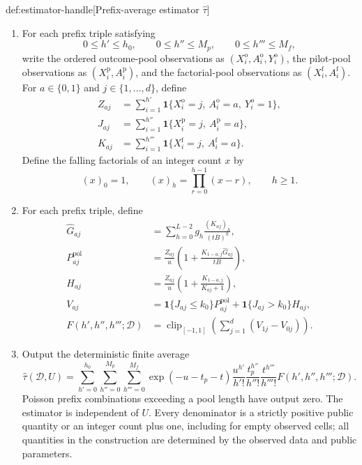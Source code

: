 \documentclass[11pt]{article}
\begin{document}
\begin{algorithmv}{def:estimator-handle}[Prefix-average estimator $\widehat\tau$]
\begin{enumerate}
\item For each prefix triple satisfying
\[
0\le h'\le h_0,\qquad
0\le h''\le M_p,\qquad
0\le h'''\le M_f,
\]
write the ordered outcome-pool observations as
\((X_i^{\mathrm o},A_i^{\mathrm o},Y_i^{\mathrm o})\), the pilot-pool observations as
\((X_i^{\mathrm p},A_i^{\mathrm p})\), and the factorial-pool observations as
\((X_i^{\mathrm f},A_i^{\mathrm f})\). For \(a\in\{0,1\}\) and \(j\in\{1,\ldots,d\}\), define
\[
\begin{aligned}
Z_{aj}
&=\sum_{i=1}^{h'}
\mathbf1\{X_i^{\mathrm o}=j,\ A_i^{\mathrm o}=a,\ Y_i^{\mathrm o}=1\},\\
J_{aj}
&=\sum_{i=1}^{h''}
\mathbf1\{X_i^{\mathrm p}=j,\ A_i^{\mathrm p}=a\},\\
K_{aj}
&=\sum_{i=1}^{h'''}
\mathbf1\{X_i^{\mathrm f}=j,\ A_i^{\mathrm f}=a\}.
\end{aligned}
\]
Define the falling factorials of an integer count \(x\) by
\[
(x)_0=1,\qquad
(x)_h=\prod_{r=0}^{h-1}(x-r),\qquad h\ge1.
\]

\item For each prefix triple, define
\[
\begin{aligned}
\widehat G_{aj}
&=\sum_{h=0}^{L-2}g_h\frac{(K_{aj})_h}{(tB)^h},\\
P_{aj}^{\mathrm{pol}}
&=\frac{Z_{aj}}u
\left(1+\frac{K_{1-a,j}\widehat G_{aj}}{tB}\right),\\
H_{aj}
&=\frac{Z_{aj}}u
\left(1+\frac{K_{1-a,j}}{K_{aj}+1}\right),\\
V_{aj}
&=\mathbf1\{J_{aj}\le k_0\}P_{aj}^{\mathrm{pol}}
+\mathbf1\{J_{aj}>k_0\}H_{aj},\\
F(h',h'',h''';\mathcal D)
&=\operatorname{clip}_{[-1,1]}
\left(\sum_{j=1}^d(V_{1j}-V_{0j})\right).
\end{aligned}
\]

\item Output the deterministic finite average
\[
\widehat\tau(\mathcal D,U)
=
\sum_{h'=0}^{h_0}\sum_{h''=0}^{M_p}\sum_{h'''=0}^{M_f}
\exp(-u-t_p-t)
\frac{u^{h'}}{h'!}
\frac{t_p^{h''}}{h''!}
\frac{t^{h'''}}{h'''!}
F(h',h'',h''';\mathcal D).
\]
Poisson prefix combinations exceeding a pool length have output zero. The estimator is independent of \(U\). Every denominator is a strictly positive public quantity or an integer count plus one, including for empty observed cells; all quantities in the construction are determined by the observed data and public parameters.
\end{enumerate}
\end{algorithmv}
\end{document}
